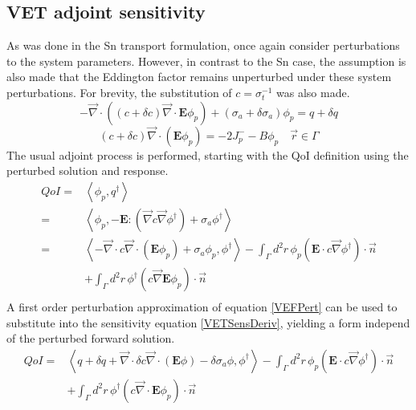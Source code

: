 \documentclass{article}
\newcommand{\vr}{\vec{r}}
\newcommand{\bra}{\left\langle}
\newcommand{\ket}{\right\rangle}
\newcommand{\vdiv}{\vec{\nabla} \cdot}
\newcommand{\vgrad}{\vec{\nabla}}
\newcommand{\Edd}{\mathbf{E}}
\newcommand{\sigt}{\sigma_t}
\newcommand{\siga}{\sigma_a}
\newcommand{\isigt}{c}
\newcommand{\scalSource}{q}
\newcommand{\scalResp}{q^\dag}
\newcommand{\qoi}{QoI}
\begin{document}
\subsection{VET adjoint sensitivity}

As was done in the Sn transport formulation, once again consider perturbations to the system parameters. However, in contrast to the Sn case, the assumption is also made that the Eddington factor remains unperturbed under these system perturbations. For brevity, the substitution of $\isigt = \sigt^{-1}$ was also made.
\begin{equation}
\label{VEFPert}
- \vdiv \left((\isigt + \delta \isigt)\vdiv \Edd \phi_p \right) + (\siga + \delta \siga)\phi_p = \scalSource + \delta \scalSource
\end{equation}
\begin{equation}
(\isigt + \delta \isigt) \vec{\nabla} \cdot \left(\Edd \phi_p \right)  = - 2J_p^- - B \phi_p \quad \vr \in \Gamma
\end{equation}
The usual adjoint process is performed, starting with the QoI definition using the perturbed solution and response. 
\begin{equation}
\label{VETSensDeriv}
\begin{split}
\qoi=&\bra \phi_p , \scalResp \ket \\
=&\bra \phi_p , - \Edd : \left( \vgrad \isigt \vgrad \phi^\dag \right) + \siga \phi^\dag \ket \\
=& \bra - \vdiv \isigt \vdiv \left( \Edd \phi_p \right) + \siga \phi_p, \phi^\dag \ket 
- \int_\Gamma d^2 r \, \phi_p \left( \Edd \cdot \isigt \vgrad \phi^\dag \right) \cdot \vec{n}  \\ 
&+ \int_\Gamma d^2 r \, \phi^\dag \left(  \isigt \vgrad \Edd \phi_p \right) \cdot \vec{n} \\
\end{split}
\end{equation}
A first order perturbation approximation of equation \ref{VEFPert} can be used to substitute into the sensitivity equation \ref{VETSensDeriv}, yielding a form independ of the perturbed forward solution.
\begin{equation}
\label{QoIVETAdjNoBC}
\begin{split}
\qoi =& \bra \scalSource + \delta \scalSource + \vdiv \delta \isigt \vdiv \left( \Edd \phi \right) - \delta \siga \phi, \phi^\dag \ket - \int_\Gamma d^2 r \, \phi_p \left( \Edd \cdot \isigt \vgrad \phi^\dag \right) \cdot \vec{n} 
\\ &+ \int_\Gamma d^2 r \, \phi^\dag \left(  \isigt \vdiv \Edd \phi_p \right) \cdot \vec{n} 
\end{split}
\end{equation}
\end{document}
